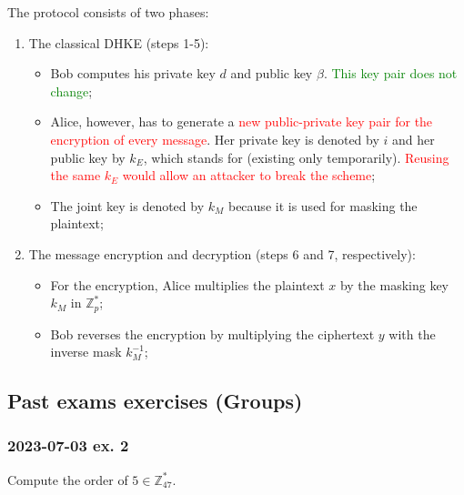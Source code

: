 \hfill\break The protocol consists of two phases:
\begin{enumerate}
    \item The classical DHKE (steps 1-5):
    \begin{itemize}
        \item Bob computes his private key $d$ and public key $\beta$. \textcolor{Green}{This key pair does not change};
        \item Alice, however, has to generate a \textcolor{red}{new public-private key pair for the encryption of every message}. Her private key is denoted by $i$ and her public key by $k_E$, which stands for  (existing only temporarily). \textcolor{red}{Reusing the same $k_E$ would allow an attacker to break the scheme};
        \item The joint key is denoted by $k_M$ because it is used for masking the plaintext;
    \end{itemize}
    \item The message encryption and decryption (steps 6 and 7, respectively):
    \begin{itemize}
        \item For the encryption, Alice multiplies the plaintext $x$ by the masking key $k_M$ in $\mathbb{Z}_p^*$;
        \item Bob reverses the encryption by multiplying the ciphertext $y$ with the inverse mask $k_M^{-1}$;
    \end{itemize}
\end{enumerate}

\newpage
\subsection{Past exams exercises (Groups)}
\subsubsection{2023-07-03 ex. 2}
Compute the order of $5\in\mathbb{Z}_{47}^*$.

